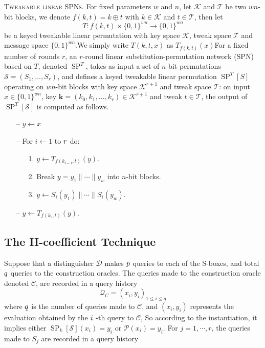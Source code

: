 \textsc{Tweakable linear SPNs.} For fixed parameters $w$ and $n$, let $\mathcal{K}$ and $\mathcal{T}$ be two $w n$-bit blocks, we denote $f(k, t) = k \oplus t$ with $k \in \mathcal{K}$ and $t \in \mathcal{T}$, then let
$$
T: f(k, t) \times \{0,1\}^{w n} \rightarrow \{0,1\}^{w n}
$$
be a keyed tweakable linear permutation with key space $\mathcal{K}$, tweak space $\mathcal{T}$ and message space $\{0,1\}^{w n}$.We simply write $T(k,t,x)$ as $T_{f(k, t)}(x)$For a fixed number of rounds $r$, an $r$-round linear substitution-permutation network (SPN) based on $T$, denoted $\operatorname{SP}^T$, takes as input a set of $n$-bit permutations $\mathcal{S} = (S_1, \ldots, S_r)$, and defines a keyed tweakable  linear permutation $\operatorname{SP}^{T}[S]$ operating on $w n$-bit blocks with key space $\mathcal{K}^{r+1}$ and tweak space $\mathcal{T}$: on input $x \in \{0,1\}^{w n}$, key $\mathbf{k} = (k_0, k_1, \ldots, k_r) \in \mathcal{K}^{r+1}$ and tweak $t \in \mathcal{T}$, the output of $\operatorname{SP}^T[\mathcal{S}]$ is computed as follows.

\begin{itemize}
  \item[--]
  $y \leftarrow x$
  \item[--]
  For $i \leftarrow 1$ to $\mathnormal{r}$ do:
  \begin{itemize}
    \item[1.]
    $y \leftarrow T_{f(k_{i-1}, t)}(y)$.
    \item[2.]
    Break $y = y_1 \| \cdots \| y_w$ into $n$-bit blocks.
    \item[3.]
   $y \leftarrow S_i(y_1) \| \cdots \| S_i(y_w)$.
  \end{itemize}
  \item[--]
  $y \leftarrow T_{f(k_{r}, t)}(y)$.
\end{itemize}


\subsection{The H-coefficient Technique}
Suppose that a distinguisher $\mathcal{D}$ makes $\mathnormal{p}$ queries to each of the S-boxes, and total $\mathnormal{q}$ queries to the construction oracles. The queries made to the construction oracle denoted $\mathcal{C}$, are recorded in a query history $$
\mathcal{Q}_{C} = (x_i,y_i)_{1 \leq i \leq q}
$$
where $\mathnormal{q}$ is the number of queries made to $\mathcal{C}$, and $(x_i,y_i)$ represents the evaluation obtained by the $\mathnormal{i}$ -th query to $\mathcal{C}$, So according to the instantiation, it implies either $\operatorname{SP}_k[\mathcal{S}](x_i) = y_i$  or $\mathcal{P}(x_i) = y_i$. For $j = 1,\cdots,r$, the queries made to $S_j$ are recorded in a query history

